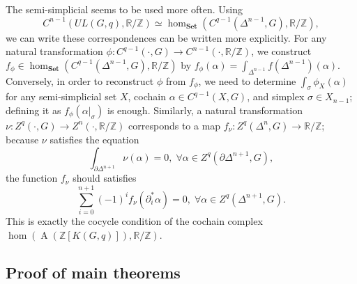 \documentclass[reprint, amsmath, amssymb, showpacs, floatfix, longbibliography, aps, twocolumn, superscriptaddress, nofootinbib]{revtex4-2}
\newcommand{\ZZ}{{\mathbb Z}}
\newcommand{\RR}{{\mathbb R}}
\theoremstyle{definition}
\begin{document}
	The semi-simplicial seems to be used more often.
	Using 
	\begin{equation}
		C^{n-1}(UL(G,q),\RR/\ZZ)\simeq \hom_{\mathbf{Set}}(C^{q-1}(\Delta^{n-1},G),\RR/\ZZ),
	\end{equation}
	we can write these correspondences can be written more explicitly.
	 For any natural transformation $\phi:C^{q-1}(\cdot,G)\rightarrow C^{n-1}(\cdot,\RR/\ZZ)$, we construct $f_\phi\in \hom_{\mathbf{Set}}(C^{q-1}(\Delta^{n-1},G),\RR/\ZZ)$  by $f_\phi(\alpha)=\int_{\Delta^{n-1}} f(\Delta^{n-1})(\alpha)$. Conversely, in order to reconstruct $\phi$ from $f_\phi$, we need to determine $\int_\sigma\phi_X(\alpha)$ for any semi-simplicial set $X$, cochain $\alpha\in C^{q-1}(X,G)$, and simplex $\sigma\in X_{n-1}$;
	 defining it as $f_\phi(\alpha|_\sigma)$ is enough. Similarly, a natural transformation $\nu:Z^{q}(\cdot,G)\rightarrow Z^{n}(\cdot,\RR/\ZZ)$ corresponds to a map $f_\nu:Z^q(\Delta^n,G)\rightarrow \RR/\ZZ$; because $\nu$ satisfies the equation
\begin{equation}
	\int_{\partial \Delta^{n+1}}\nu(\alpha)=0,\;\forall \alpha\in Z^q(\partial\Delta^{n+1},G),
\end{equation}
the function $f_\nu$ should satisfies
	\begin{equation}
		\sum_{i=0}^{n+1}(-1)^if_\nu(\partial^*_i\alpha)=0,\;\forall \alpha\in Z^q(\Delta^{n+1},G).
	\end{equation}
This is exactly the cocycle condition of the cochain complex $\hom(\operatorname{A}(\ZZ[K(G,q)]),\RR/\ZZ)$.


\subsection{Proof of main theorems}
\end{document}
